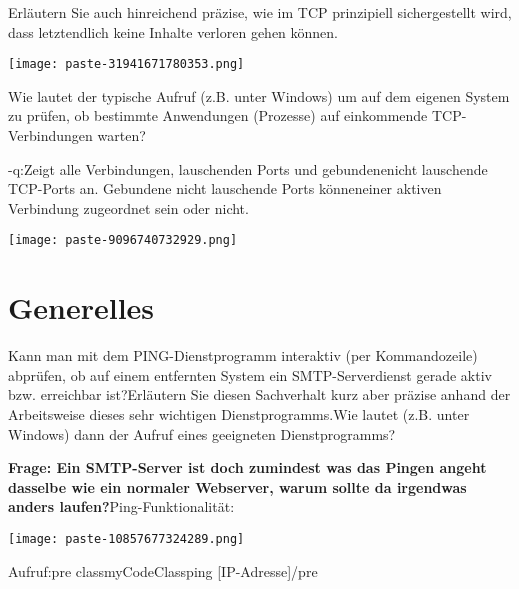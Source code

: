 \documentclass{article}
\begin{document}
\begin{tcolorbox}[colback=white!10!white,colframe=lightgray!75!black,
  savelowerto=\jobname_ex.tex,breakable,enhanced,lines before break=40]

\justifying
Erläutern Sie auch hinreichend präzise, wie im TCP prinzipiell sichergestellt wird, dass letztendlich keine Inhalte verloren gehen können.

\tcblower

\justifying
\begin{center}
\texttt{[image: paste-31941671780353.png]}
\end{center}

\end{tcolorbox}
\begin{tcolorbox}[colback=white!10!white,colframe=lightgray!75!black,
  savelowerto=\jobname_ex.tex,breakable,enhanced,lines before break=40]

\justifying
Wie lautet der typische Aufruf (z.B. unter Windows) um auf dem eigenen System zu prüfen, ob bestimmte Anwendungen (Prozesse) auf einkommende TCP-Verbindungen warten?

\tcblower

\justifying
-q:Zeigt alle Verbindungen, lauschenden Ports und gebundenenicht lauschende TCP-Ports an. Gebundene nicht lauschende Ports könneneiner aktiven Verbindung zugeordnet sein oder nicht.\begin{center}
\texttt{[image: paste-9096740732929.png]}
\end{center}

\end{tcolorbox}
\section{Generelles}
\begin{tcolorbox}[colback=white!10!white,colframe=lightgray!75!black,
  savelowerto=\jobname_ex.tex,breakable,enhanced,lines before break=40]

\justifying
Kann man mit dem PING-Dienstprogramm interaktiv (per Kommandozeile) abprüfen, ob auf einem entfernten System ein SMTP-Serverdienst gerade aktiv bzw. erreichbar ist?Erläutern Sie diesen Sachverhalt kurz aber präzise anhand der Arbeitsweise dieses sehr wichtigen Dienstprogramms.Wie lautet (z.B. unter Windows) dann der Aufruf eines geeigneten Dienstprogramms?

\tcblower

\justifying
\textbf{Frage: Ein SMTP-Server ist doch zumindest was das Pingen angeht dasselbe wie ein normaler Webserver, warum sollte da irgendwas anders laufen?}Ping-Funktionalität:\begin{center}
\texttt{[image: paste-10857677324289.png]}
\end{center}
Aufruf:pre classmyCodeClassping [IP-Adresse]/pre
\end{tcolorbox}
\end{document}
